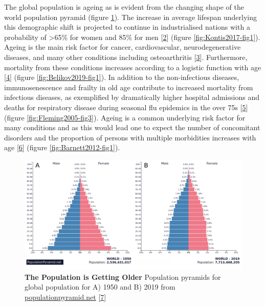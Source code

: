 \documentclass[
]{book}
\begin{document}
The global population is ageing as is evident from the changing shape of the world population pyramid (figure \ref{fig:poppyramid}).
The increase in average lifespan underlying this demographic shift is projected to continue in industrialised nations with a probability of \textgreater65\% for women and 85\% for men {[}\protect\hyperlink{ref-Kontis2017}{2}{]} (figure \ref{fig:Kontis2017-fig1}).
Ageing is the main risk factor for cancer, cardiovascular, neurodegenerative diseases, and many other conditions including osteoarthritis {[}\protect\hyperlink{ref-Niccoli2012}{3}{]}. Furthermore, mortality from these conditions increases according to a logistic function with age {[}\protect\hyperlink{ref-Belikov2019}{4}{]} (figure \ref{fig:Belikov2019-fig1}).
In addition to the non-infectious diseases, immunosenescence and frailty in old age contribute to increased mortality from infectious diseases, as exemplified by dramatically higher hospital admissions and deaths for respiratory disease during seasonal flu epidemics in the over 75s {[}\protect\hyperlink{ref-Fleming2005}{5}{]} (figure \ref{fig:Fleming2005-fig3}).
Ageing is a common underlying risk factor for many conditions and as this would lead one to expect the number of concomitant disorders and the proportion of persons with multiple morbidities increases with age {[}\protect\hyperlink{ref-Barnett2012}{6}{]} (figure \ref{fig:Barnett2012-fig1}).

\begin{figure}

{\centering \includegraphics[width=0.95\linewidth]{figs/population-pryamids-1950-2019} 

}

\caption{\textbf{The Population is Getting Older} Population pyramids for global population for A) 1950 and B) 2019 from \url{populationpyramid.net} {[}\protect\hyperlink{ref-PopulationPyramid2019}{7}{]}}\label{fig:poppyramid}
\end{figure}
\end{document}
